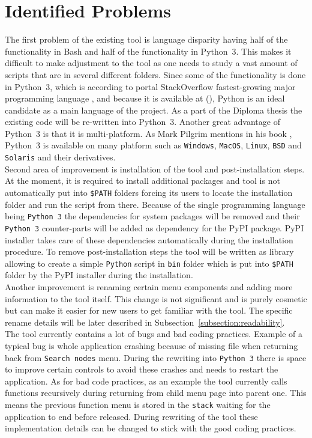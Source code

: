 \section{Identified Problems}
\label{section:improvement}
The first problem of the existing tool is language disparity having half of the functionality in Bash and half of the functionality in Python~3. This makes it difficult to make adjustment to the tool as one needs to study a vast amount of scripts that are in several different folders. Since some of the functionality is done in Python~3, which is according to portal StackOverflow fastest-growing major programming language \cite{pythonfastestgrowing}, and because it is available at  (), Python is an ideal candidate as a main language of the project. As a part of the Diploma thesis the existing code will be re-written into Python~3. Another great advantage of Python~3 is that it is multi-platform. As Mark Pilgrim mentions in his book \cite{Pilgrimc2010}, Python~3 is available on many platform such as \texttt{Windows}, \texttt{MacOS}, \texttt{Linux}, \texttt{BSD} and \texttt{Solaris} and their derivatives.\\
Second area of improvement is installation of the tool and post-installation steps. At the moment, it is required to install additional packages and tool is not automatically put into \texttt{\$PATH} folders forcing its users to locate the installation folder and run the script from there. Because of the single programming language being \texttt{Python~3} the dependencies for system packages will be removed and their \mbox{\texttt{Python~3}} counter-parts will be added as dependency for the PyPI package. PyPI installer takes care of these dependencies automatically during the installation procedure. To remove post-installation steps the tool will be written as library allowing to create a simple \texttt{Python} script in \texttt{bin} folder which is put into \texttt{\$PATH} folder by the PyPI installer during the installation.\\
Another improvement is renaming certain menu components and adding more information to the tool itself. This change is not significant and is purely cosmetic but can make it easier for new users to get familiar with the tool. The specific rename details will be later described in Subsection~\ref{subsection:readability}.\\
The tool currently contains a lot of bugs and bad coding practices. Example of a typical bug is whole application crashing because of missing file when returning back from \texttt{Search nodes} menu. During the rewriting into \texttt{Python~3} there is space to improve certain controls to avoid these crashes and needs to restart the application. As for bad code practices, as an example the tool currently calls functions recursively during returning from child menu page into parent one. This means the previous function menu is stored in the \texttt{stack} waiting for the application to end before released. During rewriting of the tool these implementation details can be changed to stick with the good coding practices. 

